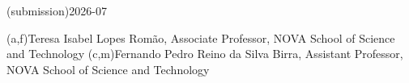 %
%
\ntdate(submission){2026-07}



%
%
%
%
(a,f){Teresa Isabel Lopes Romão, Associate Professor, NOVA School of Science and Technology}
(c,m){Fernando Pedro Reino da Silva Birra, Assistant Professor, NOVA School of Science and Technology}



%
%
%
%
